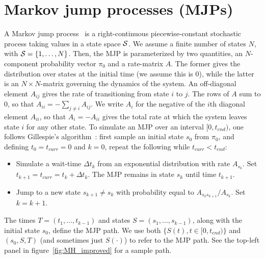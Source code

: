 \section{Markov jump processes (MJPs)} 
\label{sec:mjp}
A Markov jump process~\citep{Cinlar1975} is a right-continuous piecewise-constant stochastic process taking values in a state space ${\mathcal S}$. %
We assume a finite number of states $N$, with ${\mathcal S} = \{1,\ldots,N\}$. 
Then, the MJP is parameterized by two quantities, an $N$-component probability vector $\pi_0$ and a rate-matrix $A$. 
The former gives the distribution over states at the initial time (we assume this is $0$), while the latter is an $N \times N$-matrix governing the dynamics of the system.  
An off-diagonal element $A_{ij}$ gives the rate of transitioning from state $i$ to $j$. 
The rows of $A$ sum to $0$, so that $A_{ii}=-\sum_{j \neq i} A_{ij}  $. 
We write $A_i$ for the negative of the $i$th diagonal element $A_{ii}$, so that $A_i = -A_{ii}$ gives the total rate at which the system leaves state $i$ for any other state.
To simulate an MJP over an interval $[0,t_{end})$, one follows Gillespie's algorithm~\citep{gillespie97}: 
first sample an initial state $s_0$ from $\pi_0$, and defining $t_0 = t_{curr} = 0$ and $k = 0$, repeat the following while $t_{curr} < t_{end}$:
\begin{itemize}
  \item Simulate a wait-time $\Delta t_k$ from an exponential distribution with rate $A_{s_k}$.  
    Set $t_{k+1} = t_{curr} = t_{k} + \Delta t_k$. 
    The MJP remains in state $s_k$ until time $t_{k+1}$.
  \item Jump to a new state $s_{k+1} \neq s_k$ with probability equal to $A_{s_ks_{k+1}}/A_{s_k}$. Set $k=k+1$.
\end{itemize}
The times $T=(t_1, \dotsc, t_{k - 1})$ and states $S=(s_1, \dotsc, s_{k - 1 })$, along with the initial state $s_0$, define the MJP path. 
We use both $\{S(t), t \in [0,t_{end})\}$ and $(s_0,S,T)$ (and sometimes just $S(\cdot)$) to refer to the MJP path.
See the top-left panel in figure~\ref{fig:MH_improved} for a sample path.

\vspace{-.15in}

